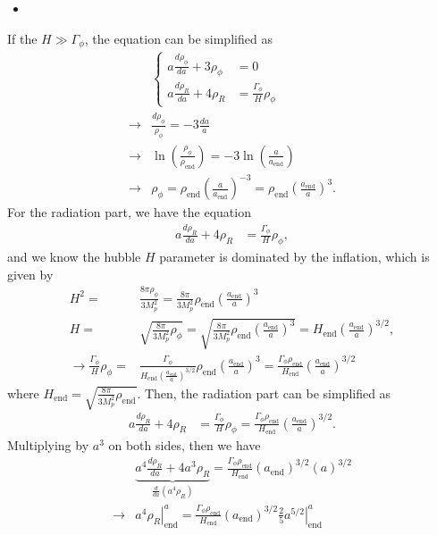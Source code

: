 \begin{itemize}
    \item [(b)]
\end{itemize}
If the $H\gg\Gamma_\phi$, the equation can be simplified as 
\begin{align}
    &\begin{cases}
        a\frac{d\rho_\phi}{da}+3 \rho_\phi&=0\\
        a \frac{d\rho_R}{da}+4 \rho_R&=\frac{\Gamma_\phi}{H}\rho_\phi
    \end{cases}\\
    \rightarrow&
    \frac{d\rho_\phi}{\rho_\phi}=-3\frac{da}{a}\\
    \rightarrow&
    \ln\left(\frac{\rho_\phi}{\rho_\text{end}}\right)=-3\ln\left(\frac{a}{a_\text{end}}\right)\\
    \rightarrow&
    \rho_\phi=\rho_\text{end}  \left(\frac{a}{a_\text{end}}\right)^{-3}=\rho_\text{end}  \left(\frac{a_\text{end}}{a}\right)^{3}.
\end{align}
For the radiation part, we have the equation 
\begin{align}
    a \frac{d\rho_R}{da}+4 \rho_R&=\frac{\Gamma_\phi}{H}\rho_\phi,
\end{align}
and we know the hubble $H$ parameter is dominated by the inflation, which is given by 
\begin{align}
    H^2=&\frac{8\pi\rho_\phi}{3M_p^2}=\frac{8\pi}{3M_p^2} \rho_\text{end}  \left(\frac{a_\text{end}}{a}\right)^{3}\\
    H=&\sqrt{\frac{8\pi}{3M_p^2} \rho_\phi}=\sqrt{\frac{8\pi}{3M_p^2} \rho_\text{end}  \left(\frac{a_\text{end}}{a}\right)^{3}}=H_\text{end}\left(\frac{a_\text{end}}{a}\right)^{3/2},\\
    \rightarrow \frac{\Gamma_\phi}{H}\rho_\phi=&\frac{\Gamma_\phi}{H_\text{end}\left(\frac{a_\text{end}}{a}\right)^{3/2}}\rho_\text{end}  \left(\frac{a_\text{end}}{a}\right)^{3}=\frac{\Gamma_\phi \rho_\text{end} }{H_\text{end}} \left(\frac{a_\text{end}}{a}\right)^{3/2}
\end{align}
where $H_\text{end}=\sqrt{\frac{8\pi}{3M_p^2} \rho_\text{end}}$. Then, the radiation part can be simplified as 
\begin{align}
    a \frac{d\rho_R}{da}+4 \rho_R&=\frac{\Gamma_\phi}{H}\rho_\phi=\frac{\Gamma_\phi \rho_\text{end} }{H_\text{end}} \left(\frac{a_\text{end}}{a}\right)^{3/2}.
\end{align}
Multiplying by $a^3$ on both sides, then we have 
\begin{align}
    &\underbrace{a^4\frac{d\rho_R}{da}+4 a^3\rho_R}_{\frac{d}{da} (a^4\rho_R)}=\frac{\Gamma_\phi \rho_\text{end} }{H_\text{end}} \left(a_\text{end}\right)^{3/2} \left(a\right)^{3/2}\\
    \rightarrow& \left.a^4\rho_R  \right|^{a}_{\text{end}}= \frac{\Gamma_\phi \rho_\text{end} }{H_\text{end}} \left(a_\text{end}\right)^{3/2}  \frac{2}{5} \left.a^{5/2}  \right|^{a}_{\text{end}}
\end{align}
